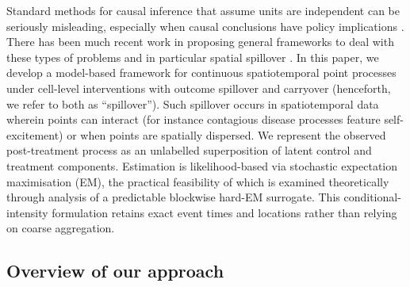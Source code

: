 \documentclass{statsoc}
\newcommand{\1}{\mathbbm{1}}
\begin{document}
Standard methods for causal inference that assume units are independent can be seriously misleading, especially when causal conclusions have policy implications \citep{benjamin2018spillover,lee2021network}.  There has been much recent work in proposing general frameworks to deal with these types of problems \citep{papadogeorgou2022causal,jiang2023instrumental} and in particular spatial spillover \citep{papadogeorgou2023spatial}. In this paper, we develop a model-based framework for continuous spatiotemporal point processes under cell-level interventions with outcome spillover and carryover (henceforth, we refer to both as ``spillover''). Such spillover occurs in spatiotemporal data wherein points can interact (for instance contagious disease processes feature self-excitement) or when points are spatially dispersed.  We represent the observed post-treatment process as an unlabelled superposition of latent control and treatment components. Estimation is likelihood-based via stochastic expectation maximisation (EM), the practical feasibility of which is examined theoretically through analysis of a predictable blockwise hard-EM surrogate. This conditional-intensity formulation retains exact event times and locations rather than relying on coarse aggregation. 



\subsection{Overview of our approach}
\end{document}
